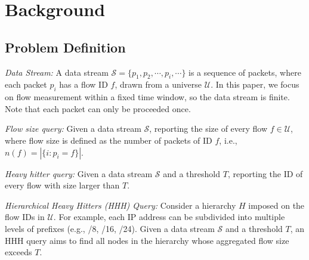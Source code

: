 \section{Background}


\subsection{Problem Definition}


\begin{definition}
    \textit{Data Stream:} A data stream \(\mathcal{S} = \{p_1, p_2, \cdots, p_i, \cdots\}\) is a sequence of packets, where each packet \(p_i\) has a flow ID \(f\), drawn from a universe \(\mathcal{U}\). In this paper, we focus on flow measurement within a fixed time window, so the data stream is finite. Note that each packet can only be proceeded once.
\end{definition}




\begin{definition}
    \textit{Flow size query:} Given a data stream \(\mathcal{S}\), reporting the size of every flow \(f \in \mathcal{U}\), where flow size is defined as the number of packets of ID \(f\), i.e., \(n(f) = |\{i:p_i=f\}|\).
\end{definition}




\begin{definition}
    \textit{Heavy hitter query:} Given a data stream \(\mathcal{S}\) and a threshold \(T\), reporting the ID of every flow with size larger than \(T\).
\end{definition}




\begin{definition}
    \textit{Hierarchical Heavy Hitters (HHH) Query:}
    Consider a hierarchy \(H\) imposed on the flow IDs in \(\mathcal{U}\). For example, each IP address can be subdivided into multiple levels of prefixes (e.g., /8, /16, /24). Given a data stream \(\mathcal{S}\) and a threshold \(T\), an HHH query aims to find all nodes in the hierarchy whose aggregated flow size exceeds \(T\). \cite{rhhh} 
\end{definition}







